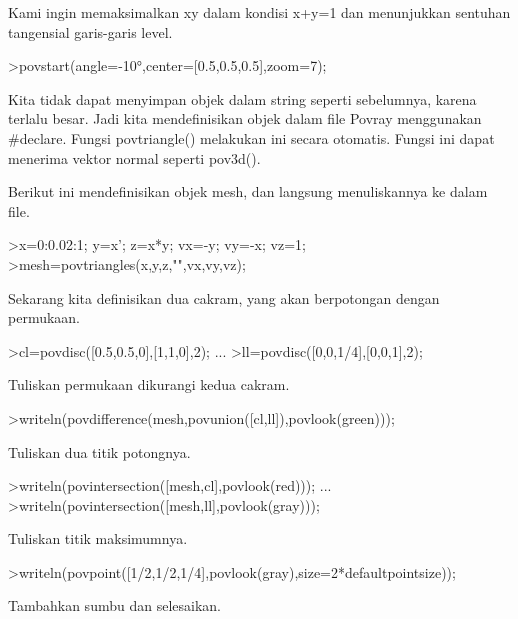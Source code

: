 \documentclass[a4paper,10pt]{article}
\begin{document}
\begin{eulernotebook}
\begin{eulercomment}
\begin{eulercomment}
\begin{eulercomment}
\begin{eulercomment}
\begin{eulercomment}
\begin{eulercomment}
\begin{eulercomment}
\begin{eulercomment}
\begin{eulercomment}
\begin{eulercomment}
\begin{eulercomment}
\begin{eulercomment}
\begin{eulercomment}
\begin{eulercomment}
\begin{eulercomment}
\begin{eulercomment}
\begin{eulercomment}
Kami ingin memaksimalkan xy dalam kondisi x+y=1 dan menunjukkan
sentuhan tangensial garis-garis level.
\end{eulercomment}
\begin{eulerprompt}
>povstart(angle=-10°,center=[0.5,0.5,0.5],zoom=7);
\end{eulerprompt}
\begin{eulercomment}
Kita tidak dapat menyimpan objek dalam string seperti sebelumnya,
karena terlalu besar. Jadi kita mendefinisikan objek dalam file Povray
menggunakan #declare. Fungsi povtriangle() melakukan ini secara
otomatis. Fungsi ini dapat menerima vektor normal seperti pov3d().

Berikut ini mendefinisikan objek mesh, dan langsung menuliskannya ke
dalam file.
\end{eulercomment}
\begin{eulerprompt}
>x=0:0.02:1; y=x'; z=x*y; vx=-y; vy=-x; vz=1;
>mesh=povtriangles(x,y,z,"",vx,vy,vz);
\end{eulerprompt}
\begin{eulercomment}
Sekarang kita definisikan dua cakram, yang akan berpotongan dengan
permukaan.
\end{eulercomment}
\begin{eulerprompt}
>cl=povdisc([0.5,0.5,0],[1,1,0],2); ...
>ll=povdisc([0,0,1/4],[0,0,1],2);
\end{eulerprompt}
\begin{eulercomment}
Tuliskan permukaan dikurangi kedua cakram.
\end{eulercomment}
\begin{eulerprompt}
>writeln(povdifference(mesh,povunion([cl,ll]),povlook(green)));
\end{eulerprompt}
\begin{eulercomment}
Tuliskan dua titik potongnya.
\end{eulercomment}
\begin{eulerprompt}
>writeln(povintersection([mesh,cl],povlook(red))); ...
>writeln(povintersection([mesh,ll],povlook(gray)));
\end{eulerprompt}
\begin{eulercomment}
Tuliskan titik maksimumnya.
\end{eulercomment}
\begin{eulerprompt}
>writeln(povpoint([1/2,1/2,1/4],povlook(gray),size=2*defaultpointsize));
\end{eulerprompt}
\begin{eulercomment}
Tambahkan sumbu dan selesaikan.
\end{eulercomment}

\end{eulercomment}
\end{eulercomment}
\end{eulercomment}
\end{eulercomment}
\end{eulercomment}
\end{eulercomment}
\end{eulercomment}
\end{eulercomment}
\end{eulercomment}
\end{eulercomment}
\end{eulercomment}
\end{eulercomment}
\end{eulercomment}
\end{eulercomment}
\end{eulercomment}
\end{eulercomment}
\end{eulernotebook}
\end{document}
